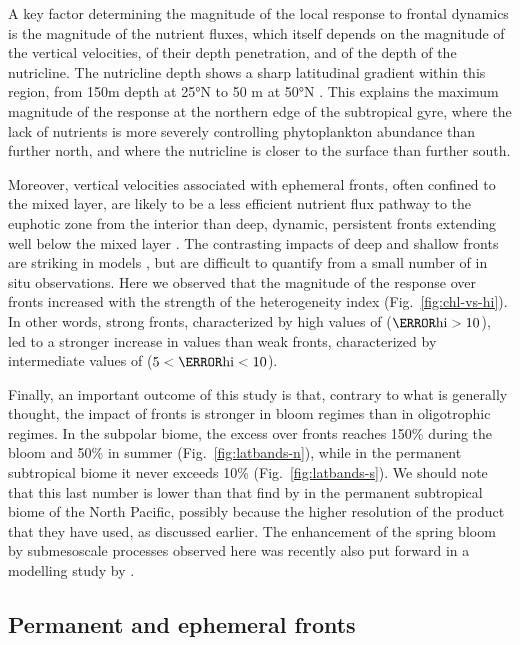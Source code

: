 A key factor determining the magnitude of the local  response to frontal dynamics is the magnitude of the nutrient fluxes, which itself depends on the magnitude of the vertical velocities, of their depth penetration, and of the depth of the nutricline.
The nutricline depth shows a sharp latitudinal gradient within this region, from 150m depth at 25°N to 50 m at 50°N \parencite{romera-castillo_2016}.
This explains the maximum magnitude of the  response at the northern edge of the subtropical gyre, where the lack of nutrients is more severely controlling phytoplankton abundance than further north, and where the nutricline is closer to the surface than further south.

Moreover, vertical velocities associated with ephemeral fronts, often confined to the mixed layer, are likely to be a less efficient nutrient flux pathway to the euphotic zone from the interior than deep, dynamic, persistent fronts extending well below the mixed layer \parencite{levy_2018}.
The contrasting impacts of deep and shallow fronts are striking in models \parencite{levy_2012}, but are difficult to quantify from a small number of in situ observations.
Here we observed that the magnitude of the  response over fronts increased with the strength of the heterogeneity index  (Fig.~\ref{fig:chl-vs-hi}).
In other words, strong fronts, characterized by high values of  (\(\mathrm{\as{hi}} > 10\)), led to a stronger increase in  values than weak fronts, characterized by intermediate values of  (\(5 < \mathrm{\as{hi}} < 10\)).

Finally, an important outcome of this study is that, contrary to what is generally thought, the impact of fronts is stronger in bloom regimes than in oligotrophic regimes.
In the subpolar biome, the   excess over fronts reaches 150\% during the bloom and 50\% in summer (Fig.~\ref{fig:latbands-n}), while in the permanent subtropical biome it never exceeds  10\% (Fig.~\ref{fig:latbands-s}).
We should note that this last number is lower than that find by \textcite{liu_2016} in the permanent subtropical biome of the North Pacific, possibly because the higher resolution of the product that they have used, as discussed earlier.
The enhancement of the spring bloom by submesoscale processes observed here was recently also put forward in a modelling study by \textcite{simoes-sousa_2022}.

\subsection{Permanent and ephemeral fronts}

